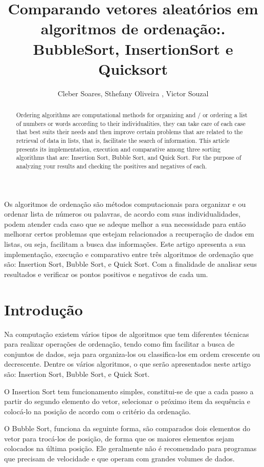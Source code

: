 \documentclass[12pt]{article}
\title{Comparando vetores aleatórios em algoritmos de ordenação:. BubbleSort, InsertionSort e Quicksort}
\author{Cleber Soares\inst{1},  Sthefany Oliveira \inst{1}, Victor Souzal\inst{1} }
\begin{document}
 

\maketitle

\begin{abstract}
  Ordering algorithms are computational methods for organizing and / or ordering a list of numbers or words according to their individualities, they can take care of each case that best suits their needs and then improve certain problems that are related to the retrieval of data in lists, that is, facilitate the search of information. This article presents its implementation, execution and comparative among three sorting algorithms that are: Insertion Sort, Bubble Sort, and Quick Sort. For the purpose of analyzing your results and checking the positives and negatives of each.
\end{abstract}
     
\begin{resumo} 
  Os algoritmos de ordenação são métodos computacionais para organizar e ou ordenar lista de números ou palavras, de acordo com suas individualidades, podem atender cada caso que se adeque melhor a sua necessidade para então melhorar certos problemas que estejam relacionados a recuperação de dados em listas, ou seja, facilitam a busca das informações. Este artigo apresenta a sua implementação, execução e comparativo entre três algoritmos de ordenação que são: Insertion Sort, Bubble Sort, e Quick Sort. Com a finalidade de analisar seus resultados e verificar os pontos positivos e negativos de cada um.
\end{resumo}	


\section{Introdução}
Na computação existem vários tipos de algoritmos que tem diferentes
técnicas para realizar operações de ordenação, tendo como fim facilitar a
busca de conjuntos de dados, seja para organiza-los ou classifica-los em
ordem crescente ou decrescente. Dentre os vários algoritmos, o que serão
apresentados neste artigo são: Insertion Sort, Bubble Sort, e Quick Sort.

O Insertion Sort tem funcionamento simples, constitui-se de que a cada
passo a partir do segundo elemento do vetor, selecionar o próximo item da
sequência e colocá-lo na posição de acordo com o critério da ordenação.

O Bubble Sort, funciona da seguinte forma, são comparados dois
elementos do vetor para trocá-los de posição, de forma que os maiores
elementos sejam colocados na última posição. Ele geralmente não é
recomendado para programas que precisam de velocidade e que operam com
grandes volumes de dados.
\end{document}
